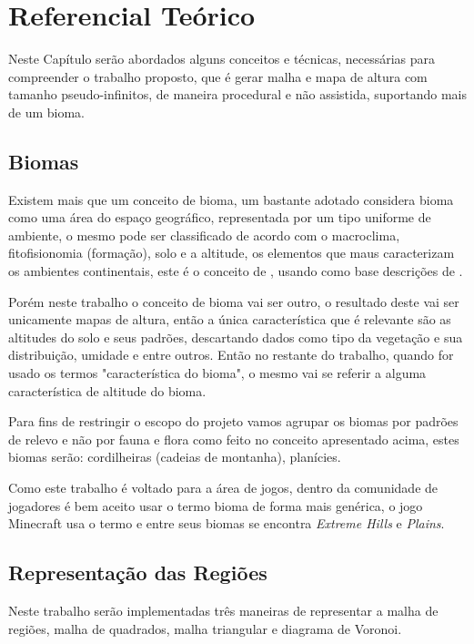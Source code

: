 \chapter{Referencial Teórico}
Neste Capítulo serão abordados alguns conceitos e técnicas, necessárias para
compreender o trabalho proposto, que é 
gerar malha e mapa de altura com tamanho pseudo-infinitos, de maneira procedural
e não assistida, suportando mais de um bioma.

\section{Biomas}
Existem mais que um conceito de bioma, um bastante adotado considera bioma como
uma área do espaço geográfico, representada por um tipo uniforme de ambiente, o
mesmo pode ser classificado de acordo com o macroclima, fitofisionomia (formação),
solo e a altitude, os elementos que maus caracterizam os ambientes continentais, 
este é o conceito de \cite{coutinho2006conceito}, usando como base descrições
de \cite{walter1986vegetaccao}.

Porém neste trabalho o conceito de bioma vai ser outro, o resultado deste
vai ser unicamente mapas de altura, então a única característica que é relevante
são as altitudes do solo e seus padrões, descartando dados como tipo da
vegetação e sua distribuição, umidade e entre outros. Então no restante 
do trabalho, quando for usado os termos "característica do bioma", o mesmo vai
se referir a alguma característica de altitude do bioma.

Para fins de restringir o escopo do projeto vamos agrupar os biomas por padrões
de relevo e não por fauna e flora como feito no conceito apresentado acima,
estes biomas serão: cordilheiras (cadeias de montanha), planícies.

Como este trabalho é voltado para a área de jogos, dentro da comunidade de jogadores
é bem aceito usar o termo bioma de forma mais genérica, o jogo Minecraft usa o
termo e entre seus biomas se encontra \textit{Extreme Hills} e \textit{Plains}.

\section{Representação das Regiões}
Neste trabalho serão implementadas três maneiras de representar a malha de
regiões, malha de quadrados, malha triangular e diagrama de Voronoi.


